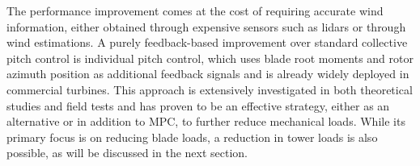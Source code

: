 The performance improvement comes at the cost of requiring accurate wind information, either obtained through expensive sensors such as lidars or through wind estimations. A purely feedback-based improvement over standard collective pitch control is individual pitch control, which uses blade root moments and rotor azimuth position as additional feedback signals and is already widely deployed in commercial turbines. This approach is extensively investigated in both theoretical studies and field tests and has proven to be an effective strategy, either as an alternative or in addition to MPC, to further reduce mechanical loads. While its primary focus is on reducing blade loads, a reduction in tower loads is also possible, as will be discussed in the next section.

